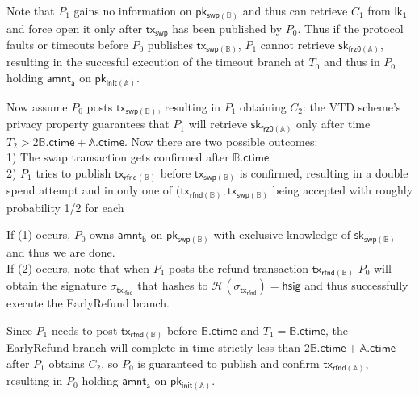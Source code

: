 \documentclass{article}      	%
\begin{document}
Note that $P_1$ gains no information on $\mathsf{pk_{swp(\mathbb{B})}}$ and thus can retrieve $C_1$ from $\mathsf{lk_1}$ and force open it only after $\mathsf{tx_{swp}}$ has been published by $P_0$. Thus if the protocol faults or timeouts before $P_0$ publishes $\mathsf{tx_{swp(\mathbb{B})}}$, $P_1$ cannot retrieve $\mathsf{sk_{frz0(\mathbb{A})}}$, resulting in the succesful execution of the timeout branch at $T_0$ and thus in $P_0$ holding $\mathsf{amnt_a}$ on $\mathsf{pk_{init(\mathbb{A})}}$. 

Now assume $P_0$ posts $\mathsf{tx_{swp(\mathbb{B})}}$, resulting in $P_1$ obtaining $C_2$: the VTD scheme's privacy property guarantees that $P_1$ will retrieve $\mathsf{sk_{frz0(\mathbb{A})}}$ only after time $T_2 > 2\mathbb{B}.\mathsf{ctime}  + \mathbb{A}.\mathsf{ctime}$. Now there are two possible outcomes: \\
1) The swap transaction gets confirmed after $\mathbb{B}.\mathsf{ctime}$  \\
2) $P_1$ tries to publish $\mathsf{tx_{rfnd(\mathbb{B})}}$ before $\mathsf{tx_{swp(\mathbb{B})}}$ is confirmed, resulting in a double spend attempt and in only one of $(\mathsf{tx_{rfnd(\mathbb{B})}}, \mathsf{tx_{swp(\mathbb{B})}}$ being accepted with roughly probability 1/2 for each

If (1) occurs, $P_0$ owns $\mathsf{amnt_b}$ on $\mathsf{pk_{swp(\mathbb{B})}}$ with exclusive knowledge of $\mathsf{sk_{swp(\mathbb{B})}}$ and thus we are done. \\
If (2) occurs, note that when $P_1$ posts the refund transaction $\mathsf{tx_{rfnd(\mathbb{B})}}$ $P_0$ will obtain the signature $\sigma_{\mathsf{tx_{rfnd}}}$ that hashes to $\mathcal{H}(\sigma_{\mathsf{tx_{rfnd}}}) = \mathsf{hsig}$  and thus successfully execute the EarlyRefund branch.

Since $P_1$ needs to post $\mathsf{tx_{rfnd(\mathbb{B})}}$ before $\mathbb{B}.\mathsf{ctime}$ and $T_1 = \mathbb{B}.\mathsf{ctime}$, the EarlyRefund branch will complete in time strictly less than $2\mathbb{B}.\mathsf{ctime} + \mathbb{A}.\mathsf{ctime}$ after $P_1$ obtains $C_2$, so $P_0$ is guaranteed to publish and confirm $\mathsf{tx_{rfnd(\mathbb{A})}}$, resulting in $P_0$ holding $\mathsf{amnt_a}$ on $\mathsf{pk_{init(\mathbb{A})}}$.
\end{document}
